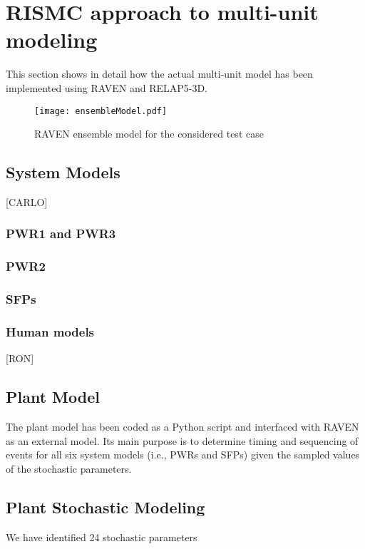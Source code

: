 \section{RISMC approach to multi-unit modeling}
\label{sec:RISMC_MU_modeling}

This section shows in detail how the actual multi-unit model has been implemented
using RAVEN and RELAP5-3D. 

\begin{figure}
    \centering
    \texttt{[image: ensembleModel.pdf]}
    \caption{RAVEN ensemble model for the considered test case}
    \label{fig:ensembleModel}
\end{figure}

\subsection{System Models}
[CARLO]
\subsubsection{PWR1 and PWR3}

\subsubsection{PWR2}

\subsubsection{SFPs}

\subsubsection{Human models}
[RON]

\subsection{Plant Model}
The plant model has been coded as a Python script and interfaced with RAVEN as an external model. Its
main purpose is to determine timing and sequencing of events for all six system models (i.e., PWRs and 
SFPs) given the sampled values of the stochastic parameters.

\subsection{Plant Stochastic Modeling}
We have identified 24 stochastic parameters 